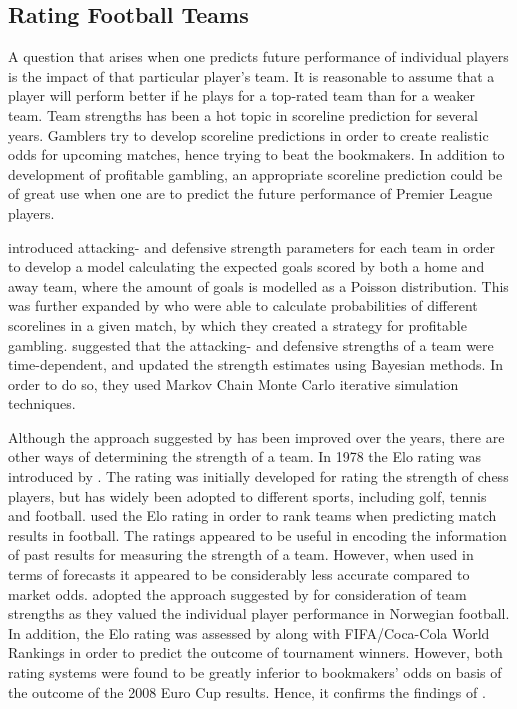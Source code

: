 \subsection{Rating Football Teams} \label{Strength_of_football_teams} 

A question that arises when one predicts future performance of individual players is the impact of that particular player's team. It is reasonable to assume that a player will perform better if he plays for a top-rated team than for a weaker team. Team strengths has been a hot topic in scoreline prediction for several years. Gamblers try to develop scoreline predictions in order to create realistic odds for upcoming matches, hence trying to beat the bookmakers. In addition to development of profitable gambling, an appropriate scoreline prediction could be of great use when one are to predict the future performance of Premier League players. 

\newpar

\cite{Maher} introduced attacking- and defensive strength parameters for each team in order to develop a model calculating the expected goals scored by both a home and away team, where the amount of goals is modelled as a Poisson distribution. This was further expanded by \cite{Dixon} who were able to calculate probabilities of different scorelines in a given match, by which they created a strategy for profitable gambling. \cite{Rue} suggested that the attacking- and defensive strengths of a team were time-dependent, and updated the strength estimates using Bayesian methods. In order to do so, they used Markov Chain Monte Carlo iterative simulation techniques.

\newpar

Although the approach suggested by \cite{Maher} has been improved over the years, there are other ways of determining the strength of a team. In 1978 the Elo rating was introduced by \cite{Elo}. The rating was initially developed for rating the strength of chess players, but has widely been adopted to different sports, including golf, tennis and football. \cite{Hvattum} used the Elo rating in order to rank teams when predicting match results in football. The ratings appeared to be useful in encoding the information of past results for measuring the strength of a team. However, when used in terms of forecasts it appeared to be considerably less accurate compared to market odds. \cite{vabo} adopted the approach suggested by \cite{Hvattum} for consideration of team strengths as they valued the individual player performance in Norwegian football. In addition, the Elo rating was assessed by \cite{Leitner} along with FIFA/Coca-Cola World Rankings \citep{FIFA} in order to predict the outcome of tournament winners. However, both rating systems were found to be greatly inferior to bookmakers' odds on basis of the outcome of the 2008 Euro Cup results. Hence, it confirms the findings of \cite{Hvattum}. 

